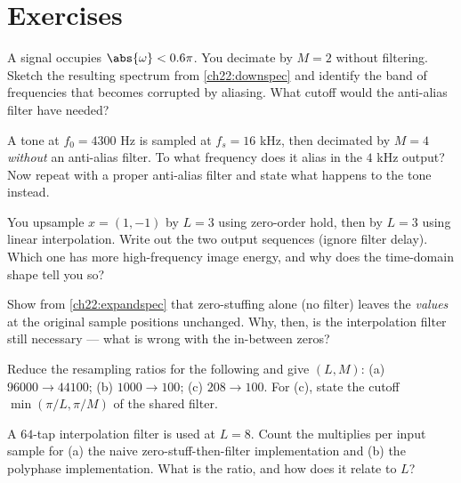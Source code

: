 \section{Exercises}
\label{ch22:exercises}

\begin{exercise}
A signal occupies $\abs{\omega} < 0.6\pi$. You decimate by $M=2$ without
filtering. Sketch the resulting spectrum from \eqref{ch22:downspec} and identify
the band of frequencies that becomes corrupted by aliasing. What cutoff would the
anti-alias filter have needed?
\end{exercise}

\begin{exercise}
A tone at $f_0 = 4300$ Hz is sampled at $f_s = 16$ kHz, then decimated by $M=4$
\emph{without} an anti-alias filter. To what frequency does it alias in the
$4$ kHz output? Now repeat with a proper anti-alias filter and state what happens
to the tone instead.
\end{exercise}

\begin{exercise}
You upsample $x = (1, -1)$ by $L=3$ using zero-order hold, then by $L=3$ using
linear interpolation. Write out the two output sequences (ignore filter delay).
Which one has more high-frequency image energy, and why does the time-domain shape
tell you so?
\end{exercise}

\begin{exercise}
Show from \eqref{ch22:expandspec} that zero-stuffing alone (no filter) leaves the
\emph{values} at the original sample positions unchanged. Why, then, is the
interpolation filter still necessary --- what is wrong with the in-between zeros?
\end{exercise}

\begin{exercise}
Reduce the resampling ratios for the following and give $(L, M)$: (a)
$96000 \to 44100$; (b) $1000 \to 100$; (c) $208 \to 100$. For (c), state the
cutoff $\min(\pi/L, \pi/M)$ of the shared filter.
\end{exercise}

\begin{exercise}
A $64$-tap interpolation filter is used at $L=8$. Count the multiplies per input
sample for (a) the naive zero-stuff-then-filter implementation and (b) the
polyphase implementation. What is the ratio, and how does it relate to $L$?
\end{exercise}

